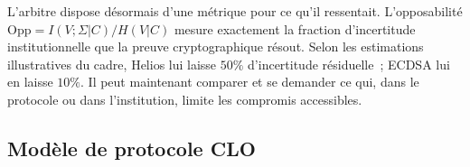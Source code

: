 \begin{boiteArbitre}
L'arbitre dispose d\'esormais d'une m\'etrique pour ce qu'il
ressentait. L'opposabilit\'e $\mathrm{Opp} = I(V;\Sigma|C)/H(V|C)$ mesure
exactement la fraction d'incertitude institutionnelle que la preuve
cryptographique r\'esout. Selon les estimations illustratives du
cadre, Helios lui laisse $50\%$ d'incertitude r\'esiduelle~; ECDSA lui en
laisse $10\%$. Il peut maintenant comparer et se demander ce qui, dans le
protocole ou dans l'institution, limite les compromis accessibles.
\end{boiteArbitre}

\subsection{Mod\`ele de protocole CLO}
\label{subsec:modele_protocole_clo}
